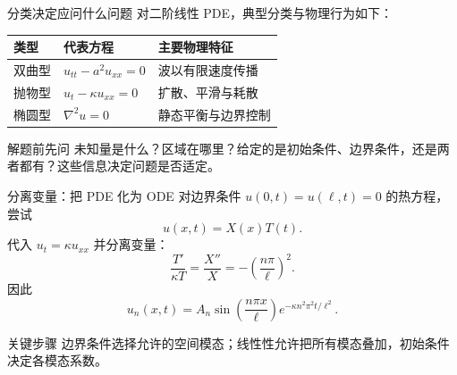 \begin{frame}{分类决定应问什么问题}
  对二阶线性 PDE，典型分类与物理行为如下：
  \begin{center}
    \begin{tabular}{lll}
      类型 & 代表方程 & 主要物理特征\\ \hline
      双曲型 & $u_{tt}-a^2u_{xx}=0$ & 波以有限速度传播\\
      抛物型 & $u_t-\kappa u_{xx}=0$ & 扩散、平滑与耗散\\
      椭圆型 & $\nabla^2u=0$ & 静态平衡与边界控制
    \end{tabular}
  \end{center}
  \begin{alertblock}{解题前先问}
    未知量是什么？区域在哪里？给定的是初始条件、边界条件，还是两者都有？这些信息决定问题是否适定。
  \end{alertblock}
\end{frame}

\begin{frame}{分离变量：把 PDE 化为 ODE}
  对边界条件 $u(0,t)=u(\ell,t)=0$ 的热方程，尝试
  \[
    u(x,t)=X(x)T(t).
  \]
  代入 $u_t=\kappa u_{xx}$ 并分离变量：
  \[
    \frac{T'}{\kappa T}=\frac{X''}{X}=-\left(\frac{n\pi}{\ell}\right)^2.
  \]
  因此
  \[
    u_n(x,t)=A_n\sin\left(\frac{n\pi x}{\ell}\right)
    e^{-\kappa n^2\pi^2t/\ell^2}.
  \]
  \begin{block}{关键步骤}
    边界条件选择允许的空间模态；线性性允许把所有模态叠加，初始条件决定各模态系数。
  \end{block}
\end{frame}

